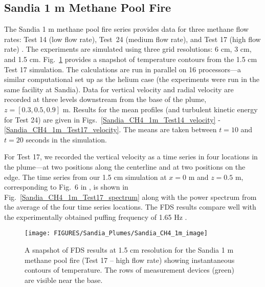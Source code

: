 \clearpage

\subsection{Sandia 1 m Methane Pool Fire}
\label{Sandia_methane}

The Sandia 1 m methane pool fire series provides data for three methane flow rates: Test 14 (low flow rate), Test~24 (medium flow rate), and Test 17 (high flow rate) \cite{Tieszen:2004}.  The experiments are simulated using three grid resolutions: 6 cm, 3 cm, and 1.5 cm.  Fig.~\ref{Sandia_CH4_1m_image} provides a snapshot of temperature contours from the 1.5 cm Test 17 simulation. The calculations are run in parallel on 16 processors---a similar computational set up as the helium case (the experiments were run in the same facility at Sandia).  Data for vertical velocity and radial velocity are recorded at three levels downstream from the base of the plume, $z = [0.3, 0.5, 0.9]$ m.  Results for the mean profiles (and turbulent kinetic energy for Test 24) are given in Figs.~\ref{Sandia_CH4_1m_Test14_velocity} - \ref{Sandia_CH4_1m_Test17_velocity}.  The means are taken between $t=10$ and $t=20$ seconds in the simulation.

For Test 17, we recorded the vertical velocity as a time series in four locations in the plume---at two positions along the centerline and at two positions on the edge.  The time series from our 1.5 cm simulation at $x=0$ m and $z=0.5$ m, corresponding to Fig.~6 in \cite{Tieszen:2002}, is shown in Fig.~\ref{Sandia_CH4_1m_Test17_spectrum} along with the power spectrum from the average of the four time series locations.  The FDS results compare well with the experimentally obtained puffing frequency of 1.65 Hz \cite{Tieszen:2002}.

\begin{figure}[h]
\begin{center}
\texttt{[image: FIGURES/Sandia\_Plumes/Sandia\_CH4\_1m\_image]}
\caption[Sandia 1~m methane pool fire instantaneous temperature contours.]{A snapshot of FDS results at 1.5 cm resolution for the Sandia 1 m methane pool fire (Test 17 -- high flow rate) showing instantaneous contours of temperature.  The rows of measurement devices (green) are visible near the base.}
\label{Sandia_CH4_1m_image}
\end{center}
\end{figure}

\newpage

